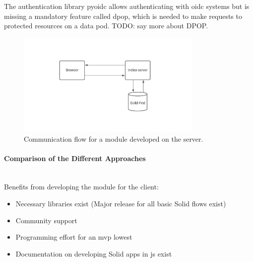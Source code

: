 The authentication library pyoidc allows authenticating with \gls{oidc} systems but is missing a mandatory feature called \gls{dpop}, which is needed to make requests to protected resources on a data pod. TODO: say more about DPOP.

\begin{figure}
    \centering
    \includegraphics[width=0.8\textwidth]{prototype/graphs/poc-infrastructure-backend.jpeg}
    \caption{Communication flow for a module developed on the server.}
    \label{fig:poc-infrastructure-backend}
\end{figure}
\vspace{0.5cm}
\paragraph{Comparison of the Different Approaches}\mbox{}\\

Benefits from developing the module for the client:

\begin{itemize}
    \item Necessary libraries exist (Major release for all basic Solid flows exist)
    \item Community support
    \item Programming effort for an \gls{mvp} lowest
    \item Documentation on developing Solid apps in \gls{js} exist
\end{itemize}

